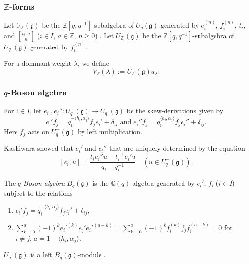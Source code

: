 \documentclass[final]{amsart}
\theoremstyle{plain}
\theoremstyle{definition}
\newcommand{\qbinom}{\genfrac{[}{]}{0pt}{}}
\newcommand{\bbQ}{\mathbb Q}
\newcommand{\bbZ}{\mathbb Z}
\newcommand{\frakg}{\mathfrak g}
\begin{document}
\subsubsection*{$\bbZ$-forms}

Let $U_\bbZ(\frakg)$ be the $\bbZ[q, q^{-1}]$-subalgebra of $U_q(\frakg)$ generated by $e_i^{(n)}$, $f_i^{(n)}$, $t_i$, and $\qbinom{t_i; a}{n}$ ($i\in I$, $a\in \bbZ$, $n \ge 0$) .
Let $U_\bbZ^-(\frakg)$ be the $\bbZ[q,q^{-1}]$-subalgebra of $U_q^-(\frakg)$ generated by $f_i^{(n)}$.

For a dominant weight $\lambda$, we define
\begin{equation}
    V_\bbZ(\lambda) := U_\bbZ^-(\frakg) u_\lambda.
\end{equation}

\subsubsection*{$q$-Boson algebra}
\label{section:definition-q-boson-algebra}

For $i\in I$, let $e_i', e_i''\colon U_q^-(\frakg) \to U_q^-(\frakg)$ be the skew-derivations given by
\[
    e_i'f_j = q_i^{-\langle h_i, \alpha_j\rangle} f_j e_i' + \delta_{ij} \text{ and } e_i'' f_j = q_i^{\langle h_i, \alpha_j\rangle} f_j e_i'' + \delta_{ij}.
\]
Here $f_j$ acts on $U_q^-(\frakg)$ by left multiplication.

Kashiwara \cite{Kashiwara:CrystalBases-QuantizedUniversalEnvelopingAlgebras} showed that $e_i'$ and $e_i''$ that are uniquely determined by the equation
\begin{equation}
    \label{equation:e-commutator}
    [e_i, u] = \frac{t_i e_i'' u - t_i^{-1} e_i' u}{q_i - q_i^{-1}} \quad (u \in U_q^-(\frakg)).
\end{equation}

The \emph{$q$-Boson algebra $B_q(\frakg)$} is the $\bbQ(q)$-algebra generated by $e_i'$, $f_i$ ($i\in I$) subject to the relations
\begin{enumerate}
    \item $e_i' f_j = q_i^{-\langle h_i, \alpha_j\rangle} f_j e_i' + \delta_{ij}$,
    \item $\sum_{k=0}^a (-1)^k e_i'^{(k)} e_j' e_i'^{(a-k)} = \sum_{k=0}^a (-1)^k f_i^{(k)} f_j f_i^{(a-k)} = 0$ for $i \neq j$, $a = 1 - \langle h_i, \alpha_j\rangle$.
\end{enumerate}

$U_q^-(\frakg)$ is a left $B_q(\frakg)$-module \cite[Lemma 3.4.2]{Kashiwara:CrystalBases-QuantizedUniversalEnvelopingAlgebras}.
\end{document}
